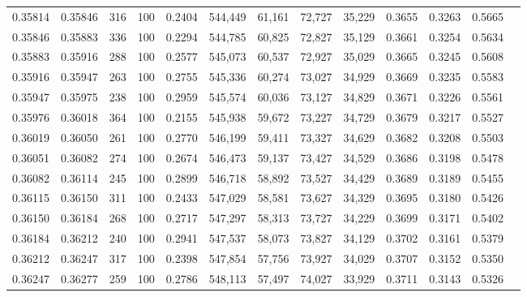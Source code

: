 \begin{tabular}{rrrrrrrrrrrrr}
0.35814 & 0.35846 &   316 & 100 &                                     0.2404 & 544,449 &  61,161 &  72,727 &  35,229 & 0.3655 & 0.3263 & 0.5665 \\
0.35846 & 0.35883 &   336 & 100 &                                     0.2294 & 544,785 &  60,825 &  72,827 &  35,129 & 0.3661 & 0.3254 & 0.5634 \\
0.35883 & 0.35916 &   288 & 100 &                                     0.2577 & 545,073 &  60,537 &  72,927 &  35,029 & 0.3665 & 0.3245 & 0.5608 \\
0.35916 & 0.35947 &   263 & 100 &                                     0.2755 & 545,336 &  60,274 &  73,027 &  34,929 & 0.3669 & 0.3235 & 0.5583 \\
0.35947 & 0.35975 &   238 & 100 &                                     0.2959 & 545,574 &  60,036 &  73,127 &  34,829 & 0.3671 & 0.3226 & 0.5561 \\
0.35976 & 0.36018 &   364 & 100 &                                     0.2155 & 545,938 &  59,672 &  73,227 &  34,729 & 0.3679 & 0.3217 & 0.5527 \\
0.36019 & 0.36050 &   261 & 100 &                                     0.2770 & 546,199 &  59,411 &  73,327 &  34,629 & 0.3682 & 0.3208 & 0.5503 \\
0.36051 & 0.36082 &   274 & 100 &                                     0.2674 & 546,473 &  59,137 &  73,427 &  34,529 & 0.3686 & 0.3198 & 0.5478 \\
0.36082 & 0.36114 &   245 & 100 &                                     0.2899 & 546,718 &  58,892 &  73,527 &  34,429 & 0.3689 & 0.3189 & 0.5455 \\
0.36115 & 0.36150 &   311 & 100 &                                     0.2433 & 547,029 &  58,581 &  73,627 &  34,329 & 0.3695 & 0.3180 & 0.5426 \\
0.36150 & 0.36184 &   268 & 100 &                                     0.2717 & 547,297 &  58,313 &  73,727 &  34,229 & 0.3699 & 0.3171 & 0.5402 \\
0.36184 & 0.36212 &   240 & 100 &                                     0.2941 & 547,537 &  58,073 &  73,827 &  34,129 & 0.3702 & 0.3161 & 0.5379 \\
0.36212 & 0.36247 &   317 & 100 &                                     0.2398 & 547,854 &  57,756 &  73,927 &  34,029 & 0.3707 & 0.3152 & 0.5350 \\
0.36247 & 0.36277 &   259 & 100 &                                     0.2786 & 548,113 &  57,497 &  74,027 &  33,929 & 0.3711 & 0.3143 & 0.5326 \\

\end{tabular}

